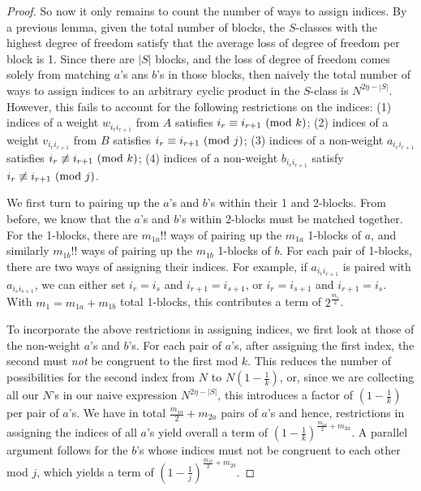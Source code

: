 \documentclass[12pt,reqno]{amsart}
\theoremstyle{plain} %
\theoremstyle{remark}
\theoremstyle{definition}
\newcommand{\abs}[1]{\left|#1\right|}
\begin{document}
\begin{proof}
So now it only remains to count the number of ways to assign indices. By a previous lemma, given the total number of blocks, the $S$-classes with the highest degree of freedom satisfy that the average loss of degree of freedom per block is 1. Since there are $\abs{S}$ blocks, and the loss of degree of freedom comes solely from matching $a$'s ans $b$'s in those blocks, then naively the total number of ways to assign indices to an arbitrary cyclic product in the $S$-class is $N^{2\eta-\abs{S}}$. However, this fails to account for the following restrictions on the indices: (1) indices of a weight $w_{i_ri_{r+1}}$ from $A$ satisfies $i_r\equiv i_{r+1}\textup{ (mod $k$)}$; (2) indices of a weight $v_{i_ri_{r+1}}$ from $B$ satisfies $i_r\equiv i_{r+1}\textup{ (mod $j$)}$; (3) indices of a non-weight $a_{i_ri_{r+1}}$ satisfies $i_{r}\not\equiv i_{r+1}\textup{ (mod $k$)}$; (4) indices of a non-weight $b_{i_ri_{r+1}}$ satisfy $i_{r}\not\equiv i_{r+1}\textup{ (mod $j$)}$.

We first turn to pairing up the $a$'s and $b$'s within their 1 and 2-blocks. From before, we know that the $a$'s and $b$'s within 2-blocks must be matched together. For the 1-blocks, there are $m_{1a}!!$ ways of pairing up the $m_{1a}$ 1-blocks of $a$, and similarly $m_{1b}!!$ ways of pairing up the $m_{1b}$ 1-blocks of $b$. For each pair of 1-blocks, there are two ways of assigning their indices. For example, if $a_{i_r i_{r+1}}$ is paired with $a_{i_s i_{s+1}}$, we can either set $i_r = i_s$ and $i_{r+1} = i_{s+1}$, or $i_r = i_{s+1}$ and $i_{r+1} = i_s$. With $m_1 = m_{1a}+m_{1b}$ total 1-blocks, this contributes a term of $2^{\frac{m_1}{2}}$. 

To incorporate the above restrictions in assigning indices, we first look at those of the non-weight $a$'s and $b$'s. For each pair of $a$'s, after assigning the first index, the second must \textit{not} be congruent to the first mod $k$. This reduces the number of possibilities for the second index from $N$ to $N\left(1-\frac{1}{k}\right)$, or, since we are collecting all our $N$'s in our naive expression $N^{2\eta-\abs{S}}$, this introduces a factor of $\left(1-\frac{1}{k}\right)$ per pair of $a$'s. We have in total $\frac{m_{1a}}{2}+m_{2a}$ pairs of $a$'s and hence, restrictions in assigning the indices of all $a$'s yield overall a term of $\left(1-\frac{1}{k}\right)^{\frac{m_{1a}}{2}+m_{2a}}$. A parallel argument follows for the $b$'s whose indices must not be congruent to each other mod $j$, which yields a term of $\left(1-\frac{1}{j}\right)^{\frac{m_{1b}}{2}+m_{2b}}$.


\end{proof}
\end{document}
